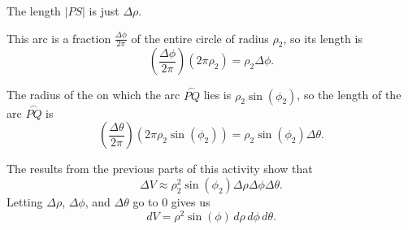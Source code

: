 \begin{smallhint}

\end{smallhint}
\begin{bighint}

\end{bighint}
\begin{activitySolution}
   \ba
    \item The length $|PS|$ is just $\Delta \rho$. 

    \item This arc is a fraction $\frac{\Delta \phi}{2 \pi}$ of the entire circle of radius $\rho_2$, so its length is
\[\left(\frac{\Delta \phi}{2\pi}\right)(2 \pi \rho_2) = \rho_2 \Delta \phi.\]


    \item The radius of the on which the arc $\overset{\frown}{PQ}$ lies is $\rho_2 \sin(\phi_2)$, so the length of the arc $\overset{\frown}{PQ}$ is  \[\left(\frac{\Delta \theta}{2\pi}\right)(2 \pi \rho_2 \sin(\phi_2)) = \rho_2 \sin(\phi_2) \Delta \theta.\]


    \item The results from the previous parts of this activity show that
\[\Delta V \approx \rho_2^2 \sin(\phi_2) \Delta \rho \Delta \phi \Delta \theta.\]
Letting $\Delta \rho$, $\Delta \phi$, and $\Delta \theta$ go to 0 gives us
\[dV = \rho^2 \sin(\phi) \, d\rho \, d\phi \, d\theta.\]

    \ea
\end{activitySolution}
\aftera
